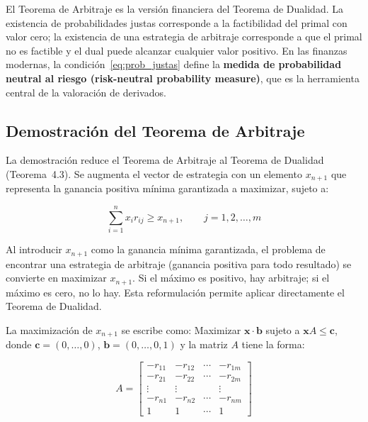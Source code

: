 \documentclass[12pt]{article}
\begin{document}
\begin{intuicion}
El Teorema de Arbitraje es la versi\'on financiera del Teorema de Dualidad.
La existencia de probabilidades justas corresponde a la factibilidad del
primal con valor cero; la existencia de una estrategia de arbitraje corresponde
a que el primal no es factible y el dual puede alcanzar cualquier valor positivo.
En las finanzas modernas, la condici\'on~\eqref{eq:prob_justas} define la
\textbf{medida de probabilidad neutral al riesgo (risk-neutral probability
measure)}, que es la herramienta central de la valoraci\'on de derivados.
\end{intuicion}

\subsection{Demostraci\'on del Teorema de Arbitraje}

La demostraci\'on reduce el Teorema de Arbitraje al Teorema de Dualidad
(Teorema~4.3). Se augmenta el vector de estrategia con un elemento $x_{n+1}$
que representa la ganancia positiva m\'inima garantizada a maximizar, sujeto a:

\begin{equation}
  \sum_{i=1}^{n} x_i r_{ij} \geq x_{n+1}, \qquad j = 1, 2, \ldots, m
\end{equation}

\begin{intuicionmat}
Al introducir $x_{n+1}$ como la ganancia m\'inima garantizada, el problema
de encontrar una estrategia de arbitraje (ganancia positiva para todo resultado)
se convierte en maximizar $x_{n+1}$. Si el m\'aximo es positivo, hay arbitraje;
si el m\'aximo es cero, no lo hay. Esta reformulaci\'on permite aplicar
directamente el Teorema de Dualidad.
\end{intuicionmat}

La maximizaci\'on de $x_{n+1}$ se escribe como: Maximizar $\mathbf{x} \cdot \mathbf{b}$
sujeto a $\mathbf{x}A \leq \mathbf{c}$, donde $\mathbf{c} = (0,\ldots,0)$,
$\mathbf{b} = (0,\ldots,0,1)$ y la matriz $A$ tiene la forma:

\begin{equation}
  A = \begin{bmatrix}
    -r_{11} & -r_{12} & \cdots & -r_{1m} \\
    -r_{21} & -r_{22} & \cdots & -r_{2m} \\
    \vdots  & \vdots  &        & \vdots  \\
    -r_{n1} & -r_{n2} & \cdots & -r_{nm} \\
    1       & 1       & \cdots & 1
  \end{bmatrix}
  \label{eq:matrizA}
\end{equation}
\end{document}
